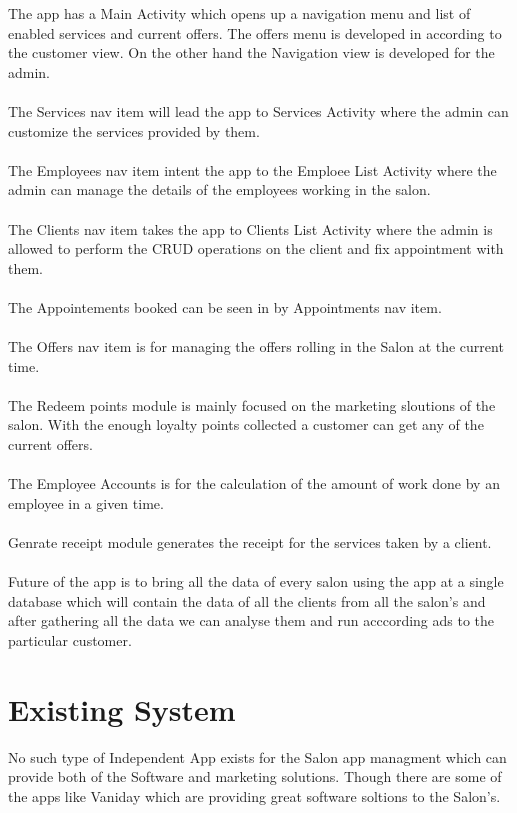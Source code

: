 The app has a Main Activity which opens up a navigation menu and list of enabled services and current offers. The offers menu is developed in according to the customer view.
On the other hand the Navigation view is developed for the admin.
\\
\\
The Services nav item will lead the app to Services Activity where the admin can customize the services provided by them.
\\
\\
The Employees nav item intent the app to the Emploee List Activity where the admin can manage the details of the employees working in the salon.
\\
\\
The Clients nav item takes the app to Clients List Activity where the admin is allowed to perform the CRUD operations on the client and fix appointment with them.
\\
\\
The Appointements booked can be seen in by Appointments nav item.
\\
\\
The Offers nav item is for managing the offers rolling in the Salon at the current time.
\\
\\
The Redeem points module is mainly focused on the marketing sloutions of the salon. With the enough loyalty points collected a customer can get any of the current offers.
\\
\\
The Employee Accounts is for the calculation of the amount of work done by an employee in a given time.
\\
\\
Genrate receipt module generates the receipt for the services taken by a client.
\\
\\

Future of the app is to bring all the data of every salon using the app at a single database which will contain the data of all the clients from all the salon's and after gathering all the data we can analyse them and run acccording ads to the particular customer.

\section{Existing System}
No such type of Independent App exists for the Salon app managment which can provide both of the Software and marketing solutions. Though there are some of the apps like Vaniday which are providing great software soltions to the Salon's.

